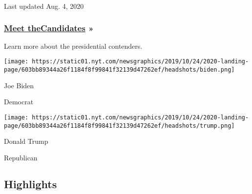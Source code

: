 Last updated Aug. 4, 2020

\hypertarget{meet-thecandidates-}{%
\subsubsection{\texorpdfstring{\href{https://www.nytimes.com/interactive/2019/us/politics/2020-presidential-candidates.html}{Meet
the}\href{https://www.nytimes.com/interactive/2019/us/politics/2020-presidential-candidates.html}{C}\href{https://www.nytimes.com/interactive/2019/us/politics/2020-presidential-candidates.html}{andidates}
»}{Meet theCandidates »}}\label{meet-thecandidates-}}

Learn more about the presidential contenders.

\href{https://www.nytimes.com/interactive/2020/us/elections/joe-biden.html}{}

\texttt{[image: https://static01.nyt.com/newsgraphics/2019/10/24/2020-landing-page/603bb89344a26f1184f8f99841f32139d47262ef/headshots/biden.png]}

Joe Biden

Democrat

\href{https://www.nytimes.com/interactive/2020/us/elections/donald-trump.html}{}

\texttt{[image: https://static01.nyt.com/newsgraphics/2019/10/24/2020-landing-page/603bb89344a26f1184f8f99841f32139d47262ef/headshots/trump.png]}

Donald Trump

Republican

\hypertarget{highlights}{%
\subsection{Highlights}\label{highlights}}

